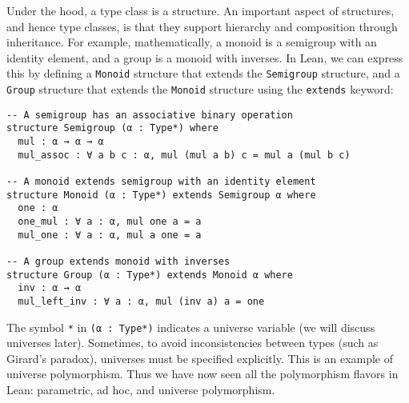 Under the hood, a type class is a structure.
An important aspect of structures, and hence type classes, is that they support hierarchy
and composition through inheritance. For example, mathematically, a monoid is a semigroup
with an identity element, and a group is a monoid with inverses. In Lean, we can express this
by defining a \lstinline[language=lean]|Monoid| structure that extends the
\lstinline[language=lean]|Semigroup| structure, and a
\lstinline[language=lean]|Group| structure that extends the
\lstinline[language=lean]|Monoid| structure using the
\lstinline[language=lean]|extends| keyword:
\begin{lstlisting}[language=lean]
-- A semigroup has an associative binary operation
structure Semigroup (α : Type*) where
  mul : α → α → α
  mul_assoc : ∀ a b c : α, mul (mul a b) c = mul a (mul b c)

-- A monoid extends semigroup with an identity element  
structure Monoid (α : Type*) extends Semigroup α where
  one : α
  one_mul : ∀ a : α, mul one a = a
  mul_one : ∀ a : α, mul a one = a

-- A group extends monoid with inverses
structure Group (α : Type*) extends Monoid α where
  inv : α → α
  mul_left_inv : ∀ a : α, mul (inv a) a = one
\end{lstlisting}
The symbol \lstinline[language=lean]|*| in \lstinline[language=lean]|(α : Type*)|
indicates a universe variable (we will discuss universes later). Sometimes,
to avoid inconsistencies between types (such as Girard's paradox),
universes must be specified explicitly. This is an example of universe polymorphism.
Thus we have now seen all the polymorphism flavors in Lean: parametric, ad hoc, and universe polymorphism.

